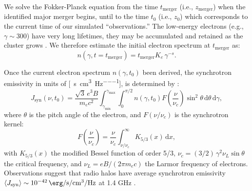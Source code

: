 \documentclass[modern]{aastex61}
\newcommand{\R}[1]{\mathrm{#1}}
\newcommand{\D}[1]{\R{d} #1}
\begin{document}
We solve the Fokker-Planck equation from the time $t_{\R{merger}}$
(i.e., $z_{\R{merger}}$) when the identified major merger begins,
until to the time $t_0$ (i.e., $z_0$) which corresponds to the current
time of our simulated \enquote{observations.}
The low-energy electrons (e.g., $\gamma \sim 300$) have very long
lifetimes, they may be accumulated and retained as the cluster
grows \citep{sarazin1999}.
We therefore estimate the initial electron spectrum at $t_{\R{merger}}$ as:
\begin{equation}
  \label{eq:ne-init}
  n(\gamma, t=t_{\R{merger}}) = t_{\R{merger}} K_e \,\gamma^{-s}.
\end{equation}

Once the current electron spectrum $n(\gamma, t_0)$ been derived,
the synchrotron emissivity in units of
[\si{\erg\per\second\per\cm\cubed\per\hertz}],
is determined by \citep{rybicki1979}:
\begin{equation}
  \label{sec:jnu-sync}
  J_{\R{syn}}(\nu, t_0) = \frac{\sqrt{3} \, e^3 B}{m_e c^2}
  \int_{\gamma_{\R{min}}}^{\gamma_{\R{max}}} \int_0^{\pi/2}
  n(\gamma, t_0) F\!\left( \frac{\nu}{\nu_c} \right) \sin^2 \!\theta
  \,\D{\theta} \,\D{\gamma},
\end{equation}
where $\theta$ is the pitch angle of the electron,
and $F(\nu/\nu_c)$ is the synchrotron kernel:
\begin{equation}
  \label{eq:sync-kernel}
  F\!\left( \frac{\nu}{\nu_c} \right) = \frac{\nu}{\nu_c}
  \int_{\nu/\nu_c}^{\infty} K_{5/3}(x) \,\D{x},
\end{equation}
with $K_{5/3}(x)$ the modified Bessel function of order 5/3,
$\nu_c = (3/2) \,\gamma^2 \nu_L \sin\theta$ the critical frequency,
and $\nu_L = e B / (2\pi m_e c)$ the Larmor frequency of electrons.
Observations suggest that radio halos have average synchrotron emissivity
$\langle {J_{\R{syn}}} \rangle \sim \SI{e-42}{\erg\per\second\per\cm\cubed\per\hertz}$
at 1.4 GHz \citep{murgia2009,feretti2012rev}.
\end{document}

